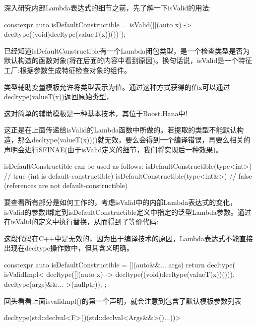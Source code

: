 深入研究内部Lambda表达式的细节之前，先了解一下isValid的用法:

\begin{cpp}
constexpr auto isDefaultConstructible
	= isValid([](auto x) -> decltype((void)decltype(valueT(x))()) {
		});
\end{cpp}

已经知道isDefaultConstructible有一个Lambda闭包类型，是一个检查类型是否为默认构造的函数对象(将在后面的内容中看到原因)。换句话说，isValid是一个特征工厂:根据参数生成特征检查对象的组件。

类型辅助变量模板允许将类型表示为值。通过这种方式获得的值x可以通过decltype(valueT(x))返回原始类型，

\begin{notice}
这对简单的辅助模板是一种基本技术，其位于Boost.Hana中!
\end{notice}

这正是在上面传递给isValid的Lambda函数中所做的。若提取的类型不能默认构造，那么decltype(valueT(x))()就无效，要么会得到一个编译错误，再要么相关的声明会进行SFINAE(由于isValid定义的细节，我们将实现后一种效果)。

\begin{cpp}
isDefaultConstructible can be used as follows:
isDefaultConstructible(type<int>) // true (int is default-constructible)
isDefaultConstructible(type<int&>) // false (references are not default-constructible)
\end{cpp}

要查看所有部分是如何工作的，考虑isValid中的内部Lambda表达式的变化，isValid的参数f绑定到isDefaultConstructible定义中指定的泛型Lambda参数。通过在isValid的定义中执行替换，从而得到了等价代码:

\begin{notice}
这段代码在C++中是无效的，因为出于编译技术的原因，Lambda表达式不能直接出现在decltype操作数中，但其含义明确。
\end{notice}

\begin{cpp}
constexpr auto isDefaultConstructible
= [](auto&&... args) {
	return decltype(
	isValidImpl<
	decltype([](auto x)
	-> decltype((void)decltype(valueT(x))())),
	decltype(args)&&...
	>(nullptr)){};
};
\end{cpp}

回头看看上面isvalidmpl()的第一个声明，就会注意到包含了默认模板参数列表

\begin{cpp}
decltype(std::declval<F>()(std::declval<Args&&>()...))>
\end{cpp}

